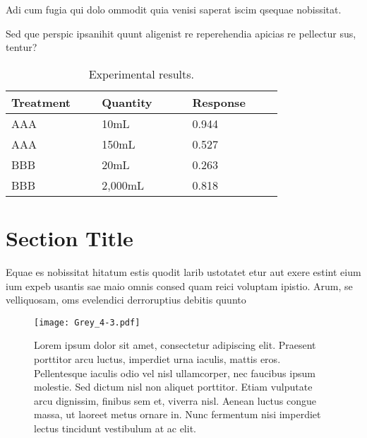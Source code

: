 \documentclass[
]{ImperialPoster}
\begin{document}
\begin{multicols}{3}
	Adi cum fugia qui dolo ommodit quia venisi saperat iscim qsequae nobissitat.
	
	Sed que perspic ipsanihit quunt aligenist re reperehendia apicias re pellectur sus, tentur? 
	
	\begin{table}[H] %
		\caption{Experimental results.}
		\begin{tabular}{L{0.26\linewidth} C{0.26\linewidth} R{0.26\linewidth}}
			\toprule
			Treatment & Quantity & Response\\
			\midrule
			AAA & 10mL & 0.944\\
			AAA & 150mL & 0.527\\
			BBB & 20mL & 0.263\\
			BBB & 2,000mL & 0.818\\
			\bottomrule
		\end{tabular}
	\end{table}
		
	\columnbreak %
	
	
	\section{Section Title}
	
	Equae es nobissitat hitatum estis quodit larib ustotatet etur aut exere estint eium ium expeb usantis sae maio omnis consed quam reici voluptam ipistio. Arum, se velliquosam, oms evelendici derroruptius debitis quunto
	
	
	\begin{figure}[H] %
		\texttt{[image: Grey\_4-3.pdf]} %
		\parbox{0.66\textwidth}{\caption{Lorem ipsum dolor sit amet, consectetur adipiscing elit. Praesent porttitor arcu luctus, imperdiet urna iaculis, mattis eros. Pellentesque iaculis odio vel nisl ullamcorper, nec faucibus ipsum molestie. Sed dictum nisl non aliquet porttitor. Etiam vulputate arcu dignissim, finibus sem et, viverra nisl. Aenean luctus congue massa, ut laoreet metus ornare in. Nunc fermentum nisi imperdiet lectus tincidunt vestibulum at ac elit.}} %
	\end{figure}
	

\end{multicols}
\end{document}
